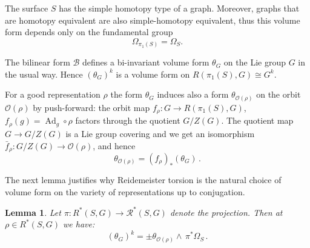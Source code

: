 \documentclass[11pt]{article}
\newtheorem{lemm}[theo]{Lemma}
\theoremstyle{definition}
\numberwithin{equation}{section}
\numberwithin{figure}{section}
\numberwithin{table}{section}
\DeclareMathOperator{\Ad}{Ad}
\newcommand{\Bcal}{\mathcal{B}}
\newcommand{\Rcal}{\mathcal{R}}
\newcommand{\Ocal}{\mathcal{O}}
\newcommand*\Rg{\Rcal^*}
\begin{document}
The surface $S$ has the simple homotopy type of a graph. Moreover, graphs that are homotopy equivalent are also simple-homotopy equivalent, thus this volume form depends only on the fundamental group
\[
\Omega_{\pi_1(S)}=\Omega_S.
\]

The bilinear form $\Bcal$ defines a bi-invariant volume form $\theta_G$ on the Lie group $G$ in the usual way. Hence $(\theta_G)^{k}$ is a volume form on $R(\pi_1(S),G)\cong G^k$.

For a good representation $\rho$ the form $\theta_G$ induces also a form $\theta_{\Ocal(\rho)}$ on the orbit $\Ocal(\rho)$ by push-forward: the orbit map $f_\rho\colon G \to R(\pi_1(S),G)$, $f_\rho(g) = \Ad_g \circ \rho$ factors through the quotient $G/Z(G)$. The quotient map $G\to G/Z(G)$ is a Lie group covering and we get an isomorphism $\bar f_\rho\colon G/Z(G)\to \Ocal(\rho)$, and hence
\begin{equation}\label{eq:push_forward}
\theta_{\Ocal(\rho)}= (f_\rho)_* (\theta_{G})\,.
\end{equation}

The next lemma justifies why Reidemeister torsion is the natural choice of volume form on the variety of representations up to conjugation.

\begin{lemm}\label{lemma:volume_orbits}
Let $\pi\colon R^*(S,G)\to \Rg(S, G)$ denote the projection. Then at $\rho\in R^*(S,G)$ we have:
\[
(\theta_G)^{k} = \pm \theta_{\Ocal(\rho)} \wedge \,{\pi^* \Omega_{S}}\,.
\]
\end{lemm}
\end{document}
